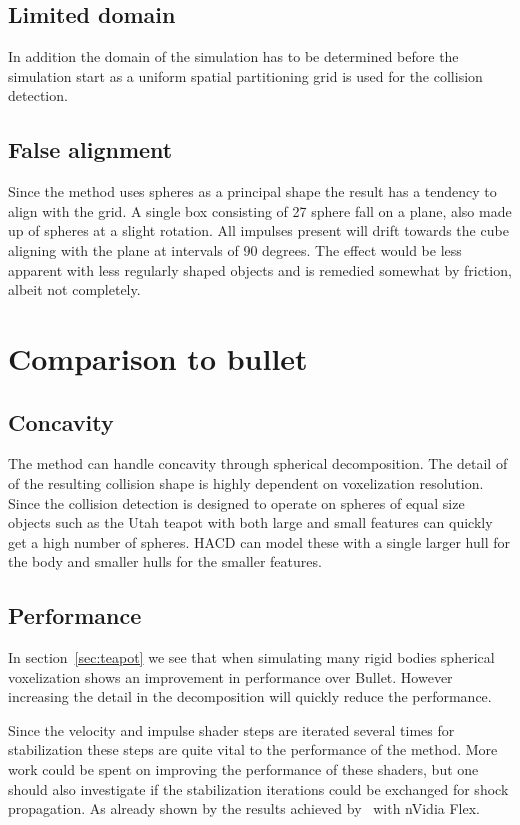 \subsection{Limited domain}
In addition the domain of the simulation has to be determined before the simulation start
as a uniform spatial partitioning grid is used for the collision detection.

\subsection{False alignment}
Since the method uses spheres as a principal shape the result has a tendency to align
with the grid. A single box consisting of 27 sphere fall on a plane, also made up of spheres
at a slight rotation. All impulses present will drift towards the cube aligning with the
plane at intervals of 90 degrees. The effect would be less apparent with less regularly shaped objects and
is remedied somewhat by friction, albeit not completely.

\section{Comparison to bullet}
\subsection{Concavity}
The method can handle concavity through spherical decomposition. The detail of of
the resulting collision shape is highly dependent on voxelization resolution.
Since the collision detection is designed to operate on spheres of equal size
objects such as the Utah teapot with both large and small features can quickly get
a high number of spheres. HACD can model these with a single larger hull for the body
and smaller hulls for the smaller features.

\subsection{Performance}
In section~\ref{sec:teapot} we see that when simulating many rigid bodies spherical
voxelization shows an improvement in performance over Bullet. However increasing
the detail in the decomposition will quickly reduce the performance.

Since the velocity and impulse shader steps are iterated
several times for stabilization these steps are quite vital to the performance
of the method. More work could be spent on improving the performance of these shaders,
but one should also investigate if the stabilization iterations could be exchanged for
shock propagation. As already shown by the results achieved by~\cite{flex} with nVidia Flex.

